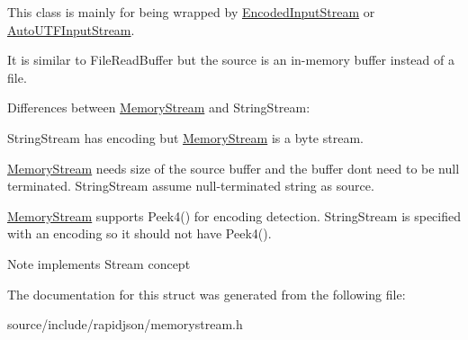 This class is mainly for being wrapped by \hyperlink{class_encoded_input_stream}{Encoded\+Input\+Stream} or \hyperlink{class_auto_u_t_f_input_stream}{Auto\+U\+T\+F\+Input\+Stream}.

It is similar to File\+Read\+Buffer but the source is an in-\/memory buffer instead of a file.

Differences between \hyperlink{struct_memory_stream}{Memory\+Stream} and String\+Stream\+:
\begin{DoxyEnumerate}
\item String\+Stream has encoding but \hyperlink{struct_memory_stream}{Memory\+Stream} is a byte stream.
\item \hyperlink{struct_memory_stream}{Memory\+Stream} needs size of the source buffer and the buffer don\textquotesingle{}t need to be null terminated. String\+Stream assume null-\/terminated string as source.
\item \hyperlink{struct_memory_stream}{Memory\+Stream} supports Peek4() for encoding detection. String\+Stream is specified with an encoding so it should not have Peek4(). \begin{DoxyNote}{Note}
implements Stream concept 
\end{DoxyNote}

\end{DoxyEnumerate}

The documentation for this struct was generated from the following file\+:\begin{DoxyCompactItemize}
\item 
source/include/rapidjson/memorystream.\+h\end{DoxyCompactItemize}
